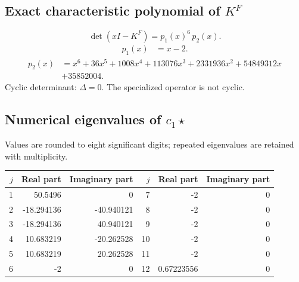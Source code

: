 \documentclass[10pt,a4paper]{article}
\begin{document}
\subsection*{Exact characteristic polynomial of $K^F$}
\[\det(xI-K^F)=p_{1}(x)^{6}\,p_{2}(x).\]
\[\begin{aligned}p_{1}(x)&=x - 2.\end{aligned}\]
\[\begin{aligned}p_{2}(x)&=x^{6} + 36 x^{5} + 1008 x^{4} + 113076 x^{3} + 2331936 x^{2} + 54849312 x\\&+35852004.\end{aligned}\]
Cyclic determinant: $\Delta=0$. The specialized operator is not cyclic.
\subsection*{Numerical eigenvalues of $c_1\star$}
Values are rounded to eight significant digits; repeated eigenvalues are retained with multiplicity.
\begin{center}\small\begin{tabular}{rrr@{\qquad}rrr}\toprule $j$ & Real part & Imaginary part & $j$ & Real part & Imaginary part\\\midrule
1 & 50.5496 & 0 & 7 & -2 & 0\\
2 & -18.294136 & -40.940121 & 8 & -2 & 0\\
3 & -18.294136 & 40.940121 & 9 & -2 & 0\\
4 & 10.683219 & -20.262528 & 10 & -2 & 0\\
5 & 10.683219 & 20.262528 & 11 & -2 & 0\\
6 & -2 & 0 & 12 & 0.67223556 & 0\\
\bottomrule\end{tabular}\end{center}
\end{document}
